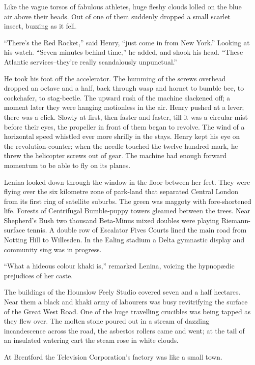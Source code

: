 \documentclass[12pt]{report}
\begin{document}
Like the vague torsos of fabulous athletes, huge fleshy clouds lolled on
the blue air above their heads. Out of one of them suddenly dropped a
small scarlet insect, buzzing as it fell.

``There's the Red Rocket,'' said Henry, ``just come in from New York.''
Looking at his watch. ``Seven minutes behind time,'' he added, and shook
his head. ``These Atlantic services--they're really scandalously
unpunctual.''

He took his foot off the accelerator. The humming of the screws overhead
dropped an octave and a half, back through wasp and hornet to bumble
bee, to cockchafer, to stag-beetle. The upward rush of the machine
slackened off; a moment later they were hanging motionless in the air.
Henry pushed at a lever; there was a click. Slowly at first, then faster
and faster, till it was a circular mist before their eyes, the propeller
in front of them began to revolve. The wind of a horizontal speed
whistled ever more shrilly in the stays. Henry kept his eye on the
revolution-counter; when the needle touched the twelve hundred mark, he
threw the helicopter screws out of gear. The machine had enough forward
momentum to be able to fly on its planes.

Lenina looked down through the window in the floor between her feet.
They were flying over the six kilometre zone of park-land that separated
Central London from its first ring of satellite suburbs. The green was
maggoty with fore-shortened life. Forests of Centrifugal Bumble-puppy
towers gleamed between the trees. Near Shepherd's Bush two thousand
Beta-Minus mixed doubles were playing Riemann-surface tennis. A double
row of Escalator Fives Courts lined the main road from Notting Hill to
Willesden. In the Ealing stadium a Delta gymnastic display and community
sing was in progress.

``What a hideous colour khaki is,'' remarked Lenina, voicing the
hypnopædic prejudices of her caste.

The buildings of the Hounslow Feely Studio covered seven and a half
hectares. Near them a black and khaki army of labourers was busy
revitrifying the surface of the Great West Road. One of the huge
travelling crucibles was being tapped as they flew over. The molten
stone poured out in a stream of dazzling incandescence across the road,
the asbestos rollers came and went; at the tail of an insulated watering
cart the steam rose in white clouds.

At Brentford the Television Corporation's factory was like a small town.
\end{document}
